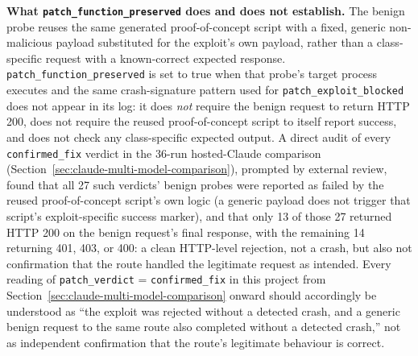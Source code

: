 \documentclass[12pt,a4paper]{report}
\begin{document}
\textbf{What \texttt{patch\_function\_preserved} does and does not establish.} The benign probe reuses the same generated proof-of-concept script with a fixed, generic non-malicious payload substituted for the exploit's own payload, rather than a class-specific request with a known-correct expected response. \texttt{patch\_function\_preserved} is set to true when that probe's target process executes and the same crash-signature pattern used for \texttt{patch\_exploit\_blocked} does not appear in its log: it does \emph{not} require the benign request to return HTTP 200, does not require the reused proof-of-concept script to itself report success, and does not check any class-specific expected output. A direct audit of every \texttt{confirmed\_fix} verdict in the 36-run hosted-Claude comparison (Section~\ref{sec:claude-multi-model-comparison}), prompted by external review, found that all 27 such verdicts' benign probes were reported as failed by the reused proof-of-concept script's own logic (a generic payload does not trigger that script's exploit-specific success marker), and that only 13 of those 27 returned HTTP 200 on the benign request's final response, with the remaining 14 returning 401, 403, or 400: a clean HTTP-level rejection, not a crash, but also not confirmation that the route handled the legitimate request as intended. Every reading of \texttt{patch\_verdict} = \texttt{confirmed\_fix} in this project from Section~\ref{sec:claude-multi-model-comparison} onward should accordingly be understood as ``the exploit was rejected without a detected crash, and a generic benign request to the same route also completed without a detected crash,'' not as independent confirmation that the route's legitimate behaviour is correct.
\end{document}
